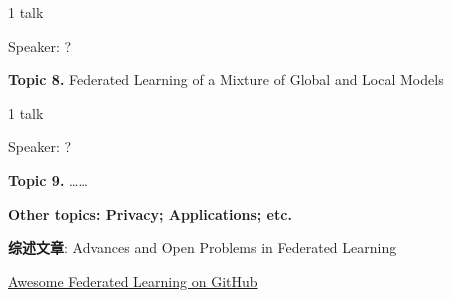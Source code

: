 1 talk

Speaker: ?

\vspace{2em}

{\bfseries \large Topic 8.} Federated Learning of a Mixture of Global and Local Models \cite{hanzely2020federated}

1 talk

Speaker: ?

\vspace{2em}

{\bfseries \large Topic 9.} \ldots\ldots

\vspace{3em}

{\bfseries \Large Other topics: Privacy; Applications; etc.}


\vspace{3em}


{\bfseries \Large 综述文章}: Advances and Open Problems in Federated Learning \cite{kairouz2019advances_fl}

\vspace{2em}

\href{https://github.com/chaoyanghe/Awesome-Federated-Learning}{Awesome Federated Learning on GitHub}




